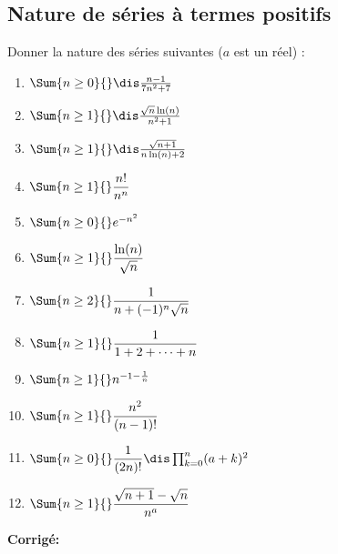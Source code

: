 \documentclass[a4paper,twoside,french,10pt]{VcCours}
\newcommand{\corr}{\textbf{Corrigé:}}
\begin{document}

\tableofcontents
\separationTitre

\bigskip


\subsection{Nature de séries à termes positifs}


\begin{Exercice}{} Donner la nature des séries suivantes ($a$ est un réel) :
\begin{multicols}{3}
\begin{enumerate}
\item $\Sum{n \geq 0}{} \dis\frac{n-1}{7n^2+7}$
\item $\Sum{n \geq 1}{}\dis\frac{\sqrt{n}\ln(n)}{n^2+1}$
\item $\Sum{n \geq 1}{}\dis\frac{\sqrt{n+1}}{n\ln(n)+2}$ 
\item $\Sum{n \geq 1}{} \dfrac{n!}{n^n} $
\columnbreak
\item $\Sum{n \geq 0}{} e^{-n^2} $
\item $\Sum{n \geq 1}{} \dfrac{\ln(n)}{\sqrt{n}} $
\item $\Sum{n \geq 2}{} \dfrac{1}{n+(-1)^n \sqrt{n}} $
\item $\Sum{n \geq 1}{} \dfrac{1}{1+2+ \cdots + n} $
\columnbreak
\item $\Sum{n \geq 1}{} n^{-1- \frac{1}{n}} $
\item $\Sum{n \geq 1}{}  \dfrac{n^2}{(n-1)!} $
\item $\Sum{n \geq 0}{} \dfrac{1}{(2n)!} \dis \prod_{k=0}^n (a+k)^2$ 
\item $\Sum{n \geq 1}{} \dfrac{\sqrt{n+1}-\sqrt{n}}{n^a}$ 
\end{enumerate}
\end{multicols}

\vspace{0.05cm}

\end{Exercice}

\corr 
\end{document}
